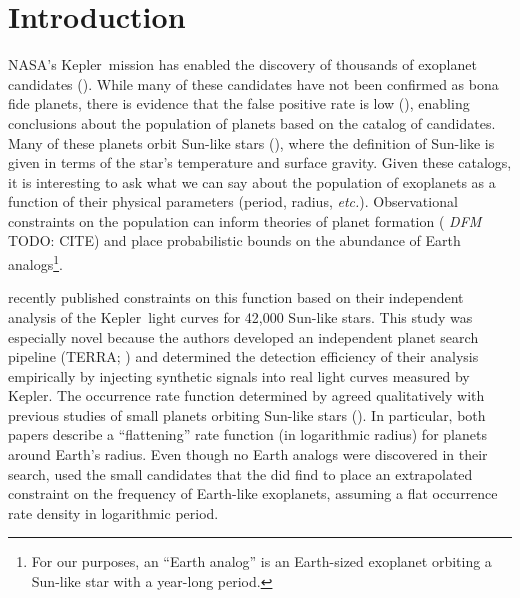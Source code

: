\documentclass[12pt,preprint]{aastex}
\newcommand{\project}[1]{{\sffamily #1}}
\newcommand{\kepler}{\project{Kepler}}
\newcommand{\terra}{\project{TERRA}}
\newcommand{\foreign}[1]{\emph{#1}}
\newcommand{\etc}{\foreign{etc.}}
\newcommand{\todo}[3]{{\color{#2} \emph{#1} TODO: #3}}
\newcommand{\dfmtodo}[1]{\todo{DFM}{red}{#1}}
\begin{document}

\section{Introduction}

NASA's \kepler\ mission has enabled the discovery of thousands of exoplanet
candidates (\citealt{kepler-catalog}).
While many of these candidates have not been confirmed as bona fide planets,
there is evidence that the false positive rate is low (\citealt{morton,
fressin-fp}), enabling conclusions about the population of planets based on
the catalog of candidates.
Many of these planets orbit Sun-like stars (\citealt{petigura}), where the
definition of Sun-like is given in terms of the star's temperature and surface
gravity.
Given these catalogs, it is interesting to ask what we can say about the
population of exoplanets as a function of their physical parameters
(period, radius, \etc).
Observational constraints on the population can inform theories of planet
formation (\dfmtodo{CITE}) and place probabilistic bounds on the abundance of
Earth analogs\footnote{For our purposes, an ``Earth analog'' is an Earth-sized
exoplanet orbiting a Sun-like star with a year-long period.}.

\citet{petigura} recently published constraints on this function based on
their independent analysis of the \kepler\ light curves for 42,000 Sun-like
stars.
This study was especially novel because the authors developed an independent
planet search pipeline (\terra; \citealt{petigura-a}) and determined the
detection efficiency of their analysis empirically by injecting synthetic
signals into real light curves measured by \kepler.
The occurrence rate function determined by \citet{petigura} agreed
qualitatively with previous studies of small planets orbiting Sun-like stars
(\citealt{dong}).
In particular, both papers describe a ``flattening'' rate function (in
logarithmic radius) for planets around Earth's radius.
Even though no Earth analogs were discovered in their search, \citet{petigura}
used the small candidates that the did find to place an extrapolated
constraint on the frequency of Earth-like exoplanets, assuming a flat
occurrence rate density in logarithmic period.
\end{document}
